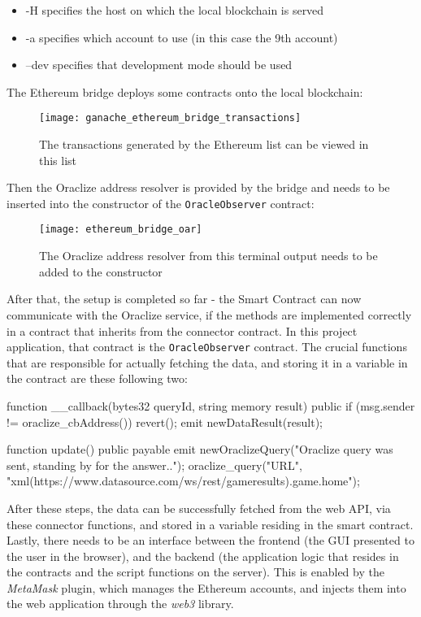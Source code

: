 \begin{itemize}
	\item -H specifies the host on which the local blockchain is served
	\item -a specifies which account to use (in this case the 9th account)
	\item --dev specifies that development mode should be used
\end{itemize}
The Ethereum bridge deploys some contracts onto the local blockchain:
\begin{figure}[H]
\centering
\texttt{[image: ganache\_ethereum\_bridge\_transactions]}
\caption{The transactions generated by the Ethereum list can be viewed in this list}
\end{figure}
Then the Oraclize address resolver is provided by the bridge and needs to be inserted into the constructor of the \texttt{OracleObserver} contract:
\begin{figure}[H]
\centering
\texttt{[image: ethereum\_bridge\_oar]}
\caption{The Oraclize address resolver from this terminal output needs to be added to the constructor}
\end{figure}
After that, the setup is completed so far - the Smart Contract can now communicate with the Oraclize service, if the methods are implemented correctly in a contract that inherits from the connector contract. In this project application, that contract is the \texttt{OracleObserver} contract. The crucial functions that are responsible for actually fetching the data, and storing it in a variable in the contract are these following two:

\begin{SolidityCode}
function __callback(bytes32 queryId, string memory result) public {
	if (msg.sender != oraclize_cbAddress())
		revert();
	emit newDataResult(result);
}

function update() public payable {
	emit newOraclizeQuery("Oraclize query was sent, standing by for the answer..");
	oraclize_query("URL", "xml(https://www.datasource.com/ws/rest/gameresults).game.home");
}
\end{SolidityCode}

After these steps, the data can be successfully fetched from the web API, via these connector functions, and stored in a variable residing in the smart contract. Lastly, there needs to be an interface between the frontend (the GUI presented to the user in the browser), and the backend (the application logic that resides in the contracts and the script functions on the server). This is enabled by the \emph{MetaMask} plugin, which manages the Ethereum accounts, and injects them into the web application through the \emph{web3} library. 
